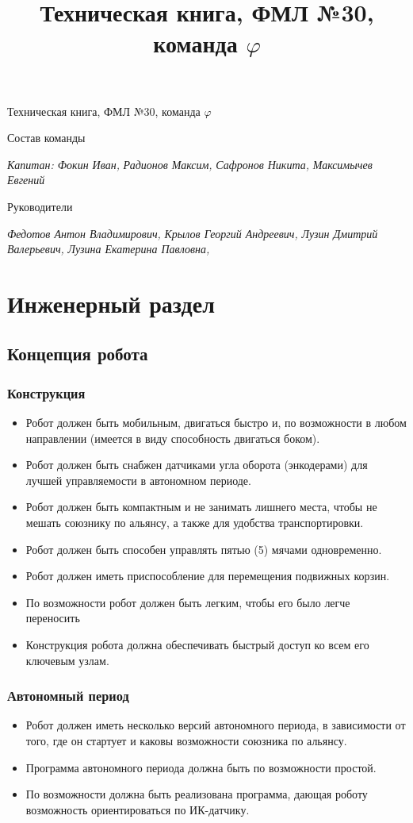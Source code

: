 \documentclass[12pt]{article}
\title{ Техническая книга, ФМЛ №30, команда ${\varphi}$}
\begin{document}
	\begin{center}
\large Техническая книга, ФМЛ №30, команда ${\varphi}$
	\end{center}
        \large Состав команды
	\begin{flushleft}
		\emph{Капитан: Фокин Иван,}
		\emph{Радионов Максим,}
		\emph{Сафронов Никита,}
		\emph{Максимычев Евгений}
	\end{flushleft}
	\large Руководители
	\begin{flushleft}
		\emph{Федотов Антон Владимирович,}
		\emph{Крылов Георгий Андреевич,}
		\emph{Лузин Дмитрий Валерьевич,}
		\emph{Лузина Екатерина Павловна,}
	\end{flushleft}		
	\newpage
	\tableofcontents{}
	\newpage
	\section{Инженерный раздел}
	\subsection{Концепция робота}
	\subsubsection{Конструкция}
	\begin{itemize}
		\item Робот должен быть мобильным, двигаться быстро и, по возможности в любом направлении (имеется в виду способность двигаться боком).
		\item Робот должен быть снабжен датчиками угла оборота (энкодерами) для лучшей управляемости в автономном периоде.
		\item Робот должен быть компактным и не занимать лишнего места, чтобы не мешать союзнику по альянсу, а также для удобства транспортировки.
		\item Робот должен быть способен управлять пятью (5) мячами одновременно.
		\item Робот должен иметь приспособление для перемещения подвижных корзин.
		\item По возможности робот должен быть легким, чтобы его было легче переносить
		\item Конструкция робота должна обеспечивать быстрый доступ ко всем его ключевым узлам.
	\end{itemize}
	\subsubsection{Автономный период}
	  \begin{itemize}
	  	\item Робот должен иметь несколько версий автономного периода, в зависимости от того, где он стартует и каковы возможности союзника по альянсу.
	  	\item Программа автономного периода должна быть по возможности простой.
	  	\item По возможности должна быть реализована программа, дающая роботу возможность ориентироваться по ИК-датчику.
	  \end{itemize}
\end{document}
